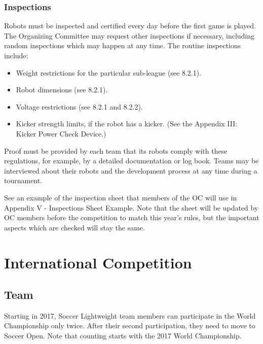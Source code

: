 \documentclass{article}
\begin{document}
\subsubsection{Inspections \label{ref-059}}

Robots must be inspected and certified every day before the first game is
played. The Organizing Committee may request other inspections if necessary,
including random inspections which may happen at any time. The routine
inspections include:

\begin{itemize}
\item Weight restrictions for the particular sub-league (see 8.2.1).

\item Robot dimensions (see 8.2.1).

\item Voltage restrictions (see 8.2.1 and 8.2.2).

\item Kicker strength limits, if the robot has a kicker. (See the Appendix III: Kicker Power Check Device.)
\end{itemize}

Proof must be provided by each team that its robots comply with these
regulations, for example, by a detailed documentation or log book. Teams may be
interviewed about their robots and the development process at any time during a
tournament.

See an example of the inspection sheet that members of the OC will use in
Appendix V - Inspections Sheet Example. Note that the sheet will be updated by
OC members before the competition to match this year's rules, but the important
aspects which are checked will stay the same.


\section{International Competition}

\subsection{Team}


Starting in 2017, Soccer Lightweight team members can participate in the World
Championship only twice. After their second participation, they need to move to
Soccer Open. Note that counting starts with the 2017 World Championship.
\end{document}
